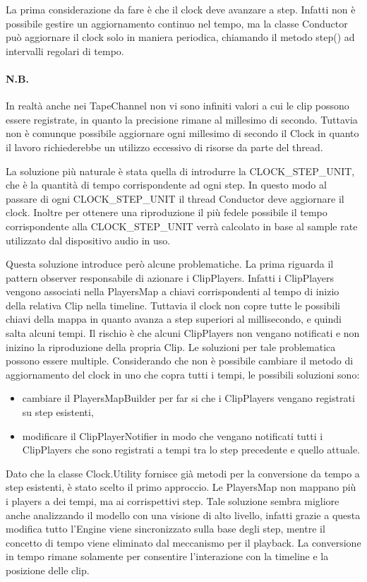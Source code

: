 \documentclass[a4paper,12pt]{report}
\begin{document}
La prima considerazione da fare è che il clock deve avanzare a step. Infatti non è possibile gestire un aggiornamento continuo nel tempo, ma la classe Conductor può aggiornare il clock solo in maniera periodica, chiamando il metodo step() ad intervalli regolari di tempo.
\paragraph{N.B.}
In realtà anche nei TapeChannel non vi sono infiniti valori a cui le clip possono essere registrate, in quanto la precisione rimane al millesimo di secondo. Tuttavia non è comunque possibile aggiornare ogni millesimo di secondo il Clock in quanto il lavoro richiederebbe un utilizzo eccessivo di risorse da parte del thread.
\endparagraph
\parskip 0.2in

La soluzione più naturale è stata quella di introdurre la CLOCK\_STEP\_UNIT, che è la quantità di tempo corrispondente ad ogni step. In questo modo al passare di ogni CLOCK\_STEP\_UNIT il thread Conductor deve aggiornare il clock.
Inoltre per ottenere una riproduzione il più fedele possibile il tempo corrispondente alla CLOCK\_STEP\_UNIT verrà calcolato in base al sample rate utilizzato dal dispositivo audio in uso.
\parskip 0in

Questa soluzione introduce però alcune problematiche. La prima riguarda il pattern observer responsabile di azionare i ClipPlayers. Infatti i ClipPlayers vengono associati nella PlayersMap a chiavi corrispondenti al tempo di inizio della relativa Clip nella timeline. Tuttavia il clock non copre tutte le possibili chiavi della mappa in quanto avanza a step superiori al millisecondo, e quindi salta alcuni tempi.
Il rischio è che alcuni ClipPlayers non vengano notificati e non inizino la riproduzione della propria Clip.
Le soluzioni per tale problematica possono essere multiple. Considerando che non è possibile cambiare il metodo di aggiornamento del clock in uno che copra tutti i tempi, le possibili soluzioni sono: 
\begin{itemize}
    \item cambiare il PlayersMapBuilder per far si che i ClipPlayers vengano registrati su step esistenti,
    \item modificare il ClipPlayerNotifier in modo che vengano notificati tutti i ClipPlayers che sono registrati a tempi tra lo step precedente e quello attuale.
\end{itemize}
Dato che la classe Clock.Utility fornisce già metodi per la conversione da tempo a step esistenti, è stato scelto il primo approccio. Le PlayersMap non mappano più i players a dei tempi, ma ai corrispettivi step.
Tale soluzione sembra migliore anche analizzando il modello con una visione di alto livello, infatti grazie a questa modifica tutto l’Engine viene sincronizzato sulla base degli step, mentre il concetto di tempo viene eliminato dal meccanismo per il playback. La conversione in tempo rimane solamente per consentire l'interazione con la timeline e la posizione delle clip.
\end{document}
